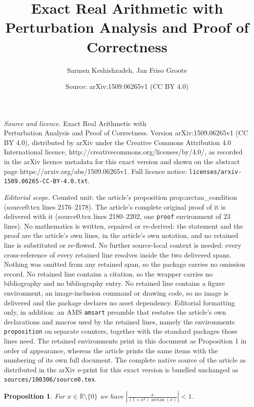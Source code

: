 \documentclass[10pt,a4paper]{amsart}
\title{Exact Real Arithmetic with \\ Perturbation Analysis and Proof of Correctness}
\author{Sarmen Keshishzadeh, Jan Friso Groote}
\date{Source: arXiv:1509.06265v1 (CC BY 4.0)}
\newtheorem{proposition}{Proposition}
\newcommand{\real}{\mathbb{R}}
\begin{document}
\maketitle

\noindent\emph{Source and licence.} Exact Real Arithmetic with \\ Perturbation Analysis and Proof of Correctness. Version arXiv:1509.06265v1 (CC BY 4.0), distributed by arXiv under the Creative Commons Attribution 4.0 International licence, http://creativecommons.org/licenses/by/4.0/, as recorded in the arXiv licence metadata for this exact version and shown on the abstract page https://arxiv.org/abs/1509.06265v1. Full licence notice: \texttt{licenses/arxiv-1509.06265-CC-BY-4.0.txt}.\par\smallskip

\noindent\textit{Editorial scope.} Counted unit: the article's proposition prop:arctan\_condition (source0.tex lines 2176--2178). The article's complete original proof of it is delivered with it (source0.tex lines 2180--2202, one \texttt{proof} environment of 23 lines). No mathematics is written, repaired or re-derived: the statement and the proof are the article's own lines, in the article's own notation, and no retained line is substituted or re-flowed.  No further source-local context is needed: every cross-reference of every retained line resolves inside the two delivered spans.  Nothing was omitted from any retained span, so the package carries no omission record.  No retained line contains a citation, so the wrapper carries no bibliography and no bibliography entry.  No retained line contains a figure environment, an image-inclusion command or drawing code, so no image is delivered and the package declares no asset dependency.  Editorial formatting only, in addition: an AMS \texttt{amsart} preamble that restates the article's own declarations and macros used by the retained lines, namely the environments \texttt{proposition} on separate counters, together with the standard packages those lines need.  The retained environments print in this document as Proposition 1 in order of appearance, whereas the article prints the same items with the numbering of its own full document.  The complete native source of the article as distributed in the arXiv e-print for this exact version is bundled unchanged as \texttt{sources/100306/source0.tex}.
\begin{proposition}\label{prop:arctan_condition}
For $x\in \real\setminus\{0\}$ we have $|\frac{x}{(1+x^2)\arctan(x)}|<1$.  
\end{proposition}
\end{document}
